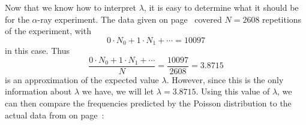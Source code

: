 Now that we know how to interpret $\lambda$, it is easy to determine what it should be for the $\alpha$-ray experiment.  The data given on page~\pageref{data} covered $N = 2608$ repetitions of the experiment, with
\[
0\cdot N_0 + 1\cdot N_1 + \cdots = 10097
\]
in this case. Thus
\[
\dfrac{0\cdot N_0 + 1\cdot N_1 + \cdots}{N} = \dfrac{10097}{2608}
        = 3.8715
\]
is an approximation of the expected value $\lambda$. However, since
this is the only information about $\lambda$ we have, we will let
$\lambda = 3.8715$. Using this value of $\lambda$, we can then compare
the frequencies predicted by the Poisson distribution to the actual
data from on page~\pageref{data}:
\begin{center}
\end{center}
